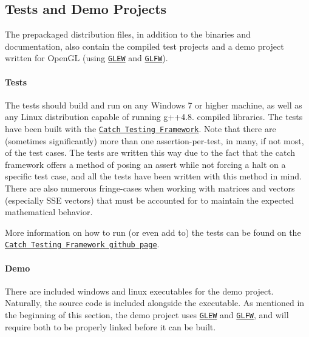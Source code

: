 \subsection*{Tests and Demo Projects}





The prepackaged distribution files, in addition to the binaries and documentation, also contain the compiled test projects and a demo project written for Open\+G\+L (using \href{http://glew.sourceforge.net/}{\tt G\+L\+E\+W} and \href{http://www.glfw.org/}{\tt G\+L\+F\+W}).

\paragraph*{Tests}





The tests should build and run on any Windows 7 or higher machine, as well as any Linux distribution capable of running g++4.8. compiled libraries. The tests have been built with the \href{https://github.com/philsquared/Catch}{\tt Catch Testing Framework}. Note that there are (sometimes significantly) more than one assertion-\/per-\/test, in many, if not most, of the test cases. The tests are written this way due to the fact that the catch framework offers a method of posing an assert while not forcing a halt on a specific test case, and all the tests have been written with this method in mind. There are also numerous fringe-\/cases when working with matrices and vectors (especially S\+S\+E vectors) that must be accounted for to maintain the expected mathematical behavior.

More information on how to run (or even add to) the tests can be found on the \href{https://github.com/philsquared/Catch}{\tt Catch Testing Framework github page}.

\paragraph*{Demo}





There are included windows and linux executables for the demo project. Naturally, the source code is included alongside the executable. As mentioned in the beginning of this section, the demo project uses \href{http://glew.sourceforge.net/}{\tt G\+L\+E\+W} and \href{http://www.glfw.org/}{\tt G\+L\+F\+W}, and will require both to be properly linked before it can be built. 